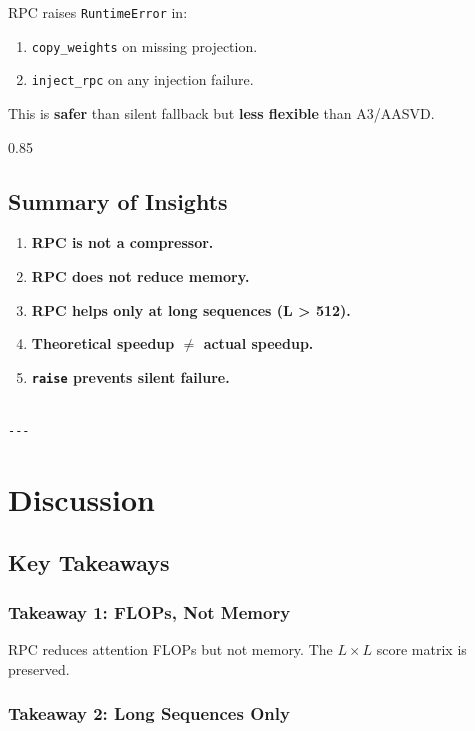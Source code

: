 RPC raises \texttt{RuntimeError} in:
\begin{enumerate}
\item \texttt{copy\_weights} on missing projection.
\item \texttt{inject\_rpc} on any injection failure.

\end{enumerate}
This is \textbf{safer} than silent fallback but \textbf{less flexible} than A3/AASVD.

0.85

\subsection{Summary of Insights}

\begin{enumerate}
\item \textbf{RPC is not a compressor.}
\item \textbf{RPC does not reduce memory.}
\item \textbf{RPC helps only at long sequences (L > 512).}
\item \textbf{Theoretical speedup $\ne$ actual speedup.}
\item \textbf{\texttt{raise} prevents silent failure.}
\end{enumerate}
\begin{lstlisting}

---
\end{lstlisting}


\section{Discussion}

\subsection{Key Takeaways}

\subsubsection{Takeaway 1: FLOPs, Not Memory}

RPC reduces attention FLOPs but not memory. The $L \times L$ score matrix 
is preserved.

\subsubsection{Takeaway 2: Long Sequences Only}

